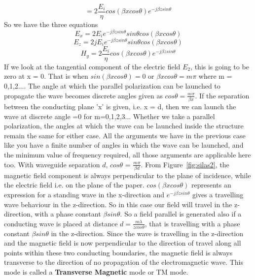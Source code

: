 \begin{equation*}
= 2\frac{E_{i}}{\eta} cos(\beta xcos\theta)e^{-j\beta zsin\theta}
\end{equation*}
So we have the three equations
\begin{equation}
E_x = 2 E_{i} e^{-j\beta zsin\theta} sin\theta cos(\beta xcos\theta)
\label{eqn:field1}
\end{equation}
\begin{equation}
E_z = 2 jE_{i} e^{-j\beta zsin\theta} sin\theta cos(\beta xcos\theta)
\label{eqn:field2}
\end{equation}
\begin{equation}
H_y = 2 \frac{E_{i}}{\eta} cos(\beta xcos\theta) e^{-j\beta zsin\theta} 
\label{eqn:field3}
\end{equation}
If we look at the tangential component of the electric field $E_{2}$, this is going to be zero at x = 0. That is when $sin(\beta xcos\theta) =0$ or $\beta xcos\theta = m\pi$ where m = 0,1,2.... The angle at which the parallel polarization can be launched to propagate the wave becomes discrete angles given as $cos\theta = \frac{m\pi}{\beta x}$. If the separation between the conducting plane 'x' is given, i.e. x = d, then we can launch the wave at discrete angle =0 for m=0,1,2,3... Whether we take a parallel polarization, the angles at which the wave can be launched inside the structure remain the same for either case. All the arguments we have in the previous case like you have a finite number of angles in which the wave can be launched, and the minimum value of frequency required, all those arguments are applicable here too. With waveguide separation $d$, $cos\theta$ = $\frac{m\pi}{\beta d}$.
From Figure~\ref{fig:silas2}, the magnetic field component is always perpendicular to the plane of incidence, while the electric field i.e. on the plane of the paper. $cos(\beta xcos\theta)$ represents an expression for a standing wave in the x-direction and $e^{-j\beta zsin\theta}$ gives a travelling wave behaviour in the z-direction. So in this case our field will travel in the z-direction, with a phase constant $\beta sin\theta$. So a field parallel is generated also if a conducting wave is placed at distance $d= \frac{m\lambda}{z cos\theta}$, that is travelling with a phase constant $\beta sin\theta$ in the z-direction. Since the wave is travelling in the z-direction and the magnetic field is now perpendicular to the direction of travel along all points within these two conducting boundaries, the magnetic field is always transverse to the direction of no propagation of the electromagnetic wave. This mode is called a \textbf{Transverse Magnetic} mode or TM mode.

